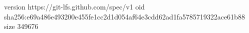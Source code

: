 version https://git-lfs.github.com/spec/v1
oid sha256:e69a486e493200e455fe1cc2d1d054af64e3cdd62ad1fa5785719322ace61b88
size 349676
